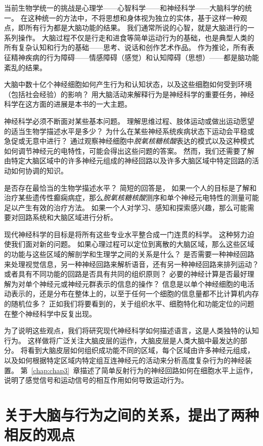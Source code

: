 当前生物学统一的挑战是心理学——心智科学——和神经科学——大脑科学的统一。 
在这种统一的方法中，不将思想和身体视为独立的实体，基于这样一种观点，即所有行为都是大脑功能的结果。 
我们通常所说的心智，就是大脑进行的一系列操作。 
大脑过程不仅是行走和进食等简单运动行为的基础，也是典型人类的所有复杂认知和行为的基础——思考、说话和创作艺术作品。 
作为推论，所有表征精神疾病的行为障碍——情感障碍（感觉）和认知障碍（思想）——都是脑功能紊乱的结果。


大脑中数十亿个神经细胞如何产生行为和认知状态，以及这些细胞如何受到环境（包括社会经验）的影响？ 
用大脑活动来解释行为是神经科学的重要任务，神经科学在这方面的进展是本书的一大主题。


神经科学必须不断面对某些基本问题。 
理解思维过程、肢体运动或做出运动愿望的适当生物学描述水平是多少？ 
为什么在某些神经系统疾病状态下运动会平稳或急促或无意中进行？ 
通过观察神经细胞中\textit{脱氧核糖核酸}表达的模式以及这种模式如何调节神经元的电特性，可能会得出这些问题的答案。 
然而，我们还需要了解由特定大脑区域中的许多神经元组成的神经回路以及许多大脑区域中特定回路的活动如何协调的知识。


是否存在最恰当的生物学描述水平？
简短的回答是，
如果一个人的目标是了解和治疗某些遗传性癫痫病症，那么\textit{脱氧核糖核酸}测序和单个神经元电特性的测量可能足以产生有效的治疗方法。
如果一个人对学习、感知和探索感兴趣，那么可能需要对回路系统和大脑区域进行分析。


现代神经科学的目标是将所有这些专业水平整合成一门连贯的科学。
这种努力迫使我们面对新的问题。
如果心理过程可以定位到离散的大脑区域，那么这些区域的功能与这些区域的解剖学和生理学之间的关系是什么？ 
是否需要一种神经回路来处理视觉信息，另一种神经回路来解析语音，还有另一种神经回路来排列运动？
或者具有不同功能的回路是否具有共同的组织原则？
必要的神经计算是否最好理解为对单个神经元或神经元群表示的信息的操作？
信息是以单个神经细胞的电活动表示的，还是分布在整体上的，以至于任何一个细胞的信息量都不比计算机内存的随机位多？
正如我们将要看到的，关于组织水平、细胞特化和功能定位的问题在整个神经科学中反复出现。


为了说明这些观点，我们将研究现代神经科学如何描述语言，这是人类独特的认知行为。
这样做将广泛关注大脑皮层的运作，大脑皮层是人类大脑中最发达的部分。
将看到大脑皮层如何组织成功能不同的区域，每个区域由许多神经元组成，以及如何根据特定区域内特定组互连神经元的活动来分析高度复杂行为的神经装置。
第~\ref{chap:chap3}~章描述了简单反射行为的神经回路如何在细胞水平上运作，说明了感觉信号和运动信号的相互作用如何导致运动行为。



\section{关于大脑与行为之间的关系，提出了两种相反的观点}

